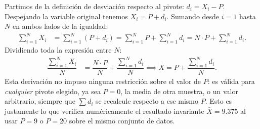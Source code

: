 \begin{solproblema}[prob:08f4f21]
	Partimos de la definición de desviación respecto al pivote: $d_{i} = X_{i} - P$. Despejando la variable original tenemos $X_{i} = P + d_{i}$. Sumando desde $i=1$ hasta $N$ en ambos lados de la igualdad:
	\begin{align}
		\sum_{i=1}^{N} X_{i} &= \sum_{i=1}^{N} (P + d_{i}) = \sum_{i=1}^{N} P + \sum_{i=1}^{N} d_{i} = N \cdot P + \sum_{i=1}^{N} d_{i}.
	\end{align}
	Dividiendo toda la expresión entre $N$:
	\begin{align}
		\dfrac{\sum_{i=1}^{N} X_{i}}{N} &= \dfrac{N \cdot P}{N} + \dfrac{\sum_{i=1}^{N} d_{i}}{N} \implies \bar{X} = P + \dfrac{\sum_{i=1}^{N} d_{i}}{N}.
	\end{align}
	Esta derivación no impuso ninguna restricción sobre el valor de $P$: es válida para \emph{cualquier} pivote elegido, ya sea $P=0$, la media de otra muestra, o un valor arbitrario, siempre que $\sum d_i$ se recalcule respecto a ese mismo $P$. Esto es justamente lo que verifica numéricamente el resultado invariante $\bar{X}=9.375$ al usar $P=9$ o $P=20$ sobre el mismo conjunto de datos.
\end{solproblema}

